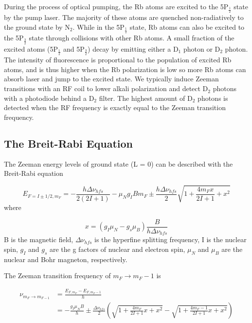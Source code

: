 During the process of optical pumping, the Rb atoms are excited to the 5P$_{\frac{1}{2}}$ state by the pump laser. The majority of these atoms are quenched non-radiatively to the ground state by N$_{2}$. While in the 5P$_{\frac{1}{2}}$ state, Rb atoms can also be excited to the 5P$_{\frac{3}{2}}$ state through collisions with other Rb atoms. A small fraction of the excited atoms (5P$_{\frac{1}{2}}$ and 5P$_{\frac{3}{2}}$) decay by emitting either a D$_{1}$ photon or D$_{2}$ photon. The intensity of fluorescence is proportional to the population of excited Rb atoms, and is thus higher when the Rb polarization is low so more Rb atoms can absorb laser and jump to the excited state. We typically induce Zeeman transitions with an RF coil to lower alkali polarization and detect D$_{2}$ photons with a photodiode behind a D$_{2}$ filter. The highest amount of D$_{2}$ photons is detected when the RF frequency is exactly equal to the Zeeman transition frequency.

\subsection{The Breit-Rabi Equation}

The Zeeman energy levels of ground state (L = 0) can be described with the Breit-Rabi equation\cite{PhysRev.38.2082.2}

\begin{equation}
E_{F=I\pm 1/2, m_{F}}=-\frac{h\Delta \nu_{hfs}}{2(2I+1)}-\mu_{N}g_{I}Bm_{F}\pm \frac{h\Delta \nu_{hfs}}{2}\sqrt{1+\frac{4m_{F}x}{2I+1} +x^{2}}
\end{equation}
where

\begin{equation}
x=(g_{I}\mu_{N}-g_{s}\mu_{B})\frac{B}{h\Delta \nu_{hfs}}
\end{equation}
B is the magnetic field, $\Delta \nu_{hfs}$ is the hyperfine splitting frequency, I is the nuclear spin, $g_{I}$ and $g_{s}$ are the g factors of nuclear and electron spin, $\mu_{N}$ and $\mu_{B}$ are the nuclear and Bohr magneton, respectively. 

The Zeeman transition frequency of $m_{F} \rightarrow m_{F} - 1$ is 

\begin{equation}
\begin{split}
\nu_{m_{F}\rightarrow m_{F-1}} &=\frac{E_{F,m_{F}}-E_{F,m_{F}-1}}{h} \\
&= -\frac{g_{I}\mu_{N}B}{h}\pm \frac{\Delta \nu_{hfs}}{2}\left(\sqrt{1+\frac{4m_{F}}{2I+1}x+x^{2}}-\sqrt{1+\frac{4m_{F}-1}{2I+1}x+x^{2}}\right)
\end{split}
\end{equation}

